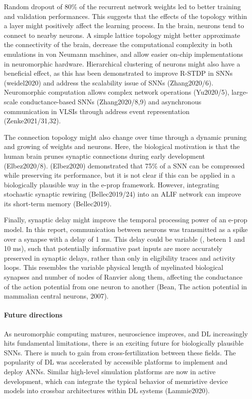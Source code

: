     Random dropout of 80\% of the recurrent network weights led to better training and validation performances.
    This suggests that the effects of the topology within a layer might positively affect the learning process.
    In the brain, neurons tend to connect to nearby neurons.
    A simple lattice topology might better approximate the connectivity of the brain, decrease the computational complexity in both emulations in von Neumann machines, and allow easier on-chip implementations in neuromorphic hardware.
    Hierarchical clustering of neurons might also have a beneficial effect, as this has been demonstrated to improve R-STDP in SNNs (weidel2020) and address the scalability issue of SNNs (Zhang2020/6).
    Neuromorphic computation allows complex network operations (Yu2020/5), large-scale conductance-based SNNs (Zhang2020/8,9) and asynchronous communication in VLSIs through address event representation (Zenke2021/31,32).

    The connection topology might also change over time through a dynamic pruning and growing of weights and neurons.
    Here, the biological motivation is that the human brain prunes synaptic connections during early development (Elbez2020/8).
    (Elbez2020) demonstrated that 75\% of a SNN can be compressed while preserving its performance, but it is not clear if this can be applied in a biologically plausible way in the e-prop framework.
    However, integrating stochastic synaptic rewiring (Bellec2019/24) into an ALIF network can improve its short-term memory (Bellec2019).

    Finally, synaptic delay might improve the temporal processing power of an e-prop model.
    In this report, communication between neurons was transmitted as a spike over a synapse with a delay of 1 ms.
    This delay could be variable (\eg, beteen 1 and 10 ms), such that potentially informative past inputs are more accurately preserved in synaptic delays, rather than only in eligibility traces and activity loops.
    This resembles the variable physical length of myelinated biological synapses and number of nodes of Ranvier along them, affecting the conductance of the action potential from one neuron to another (Bean, The action potential in mammalian central neurons, 2007).

\paragraph{Future directions}
    As neuromorphic computing matures, neuroscience improves, and DL increasingly hits fundamental limitations, there is an exciting future for biologically plausible SNNs.
    There is much to gain from cross-fertilization between these fields.
    The popularity of DL was accelerated by accessible platforms to implement and deploy ANNs.
    Similar high-level simulation platforms are now in active development, which can integrate the typical behavior of memristive device models into crossbar architectures within DL systems (Lammie2020).

